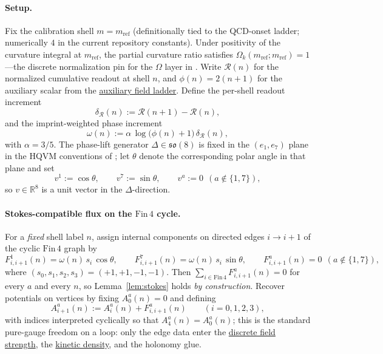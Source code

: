 \documentclass[11pt]{amsart}
\begin{document}
\paragraph{Setup.}
Fix the calibration shell \(m=m_{\mathrm{ref}}\) (definitionally tied to the QCD-onset ladder; numerically \(4\) in the current repository constants). Under positivity of the curvature integral at \(m_{\mathrm{ref}}\), the partial curvature ratio satisfies \(\Omega_k(m_{\mathrm{ref}};m_{\mathrm{ref}})=1\)---the discrete normalization pin for the \(\Omega\) layer in \cite{hqiv-so8-paper}. Write \(\mathcal{R}(n)\) for the normalized cumulative readout at shell \(n\), and \(\phi(n)=2(n+1)\) for the auxiliary scalar from the \hyperref[lean:phi-ladder]{auxiliary field ladder}. Define the per-shell readout increment
\[
\delta_{\mathcal{R}}(n):=\mathcal{R}(n+1)-\mathcal{R}(n),
\]
and the imprint-weighted phase increment
\begin{equation}
\label{eq:omega-n}
\omega(n):=\alpha\,\log\bigl(\phi(n)+1\bigr)\,\delta_{\mathcal{R}}(n),
\end{equation}
with \(\alpha=3/5\). The phase-lift generator \(\Delta\in\mathfrak{so}(8)\) is fixed in the \((e_1,e_7)\) plane in the HQVM conventions of \cite{hqiv-so8-paper}; let \(\theta\) denote the corresponding polar angle in that plane and set
\[
v^1:=\cos\theta,\qquad v^7:=\sin\theta,\qquad v^a:=0\ \ (a\notin\{1,7\}),
\]
so \(v\in\mathbb{R}^8\) is a unit vector in the \(\Delta\)-direction.

\paragraph{Stokes-compatible flux on the \(\mathrm{Fin}\,4\) cycle.}
For a \emph{fixed} shell label \(n\), assign internal components on directed edges \(i\to i+1\) of the cyclic \(\mathrm{Fin}\,4\) graph by
\begin{equation}
\label{eq:seed-F}
F^1_{i,i+1}(n)=\omega(n)\,s_i\,\cos\theta,\qquad
F^7_{i,i+1}(n)=\omega(n)\,s_i\,\sin\theta,\qquad
F^a_{i,i+1}(n)=0\ \ (a\notin\{1,7\}),
\end{equation}
where \((s_0,s_1,s_2,s_3)=(+1,+1,-1,-1)\). Then \(\sum_{i\in \mathrm{Fin}\,4} F^a_{i,i+1}(n)=0\) for every \(a\) and every \(n\), so Lemma~\ref{lem:stokes} holds \emph{by construction}. Recover potentials on vertices by fixing \(A^a_0(n)=0\) and defining
\[
A^a_{i+1}(n):=A^a_i(n)+F^a_{i,i+1}(n)\qquad (i=0,1,2,3),
\]
with indices interpreted cyclically so that \(A^a_4(n)=A^a_0(n)\); this is the standard pure-gauge freedom on a loop: only the edge data enter the \hyperref[lean:F-from-A]{discrete field strength}, the \hyperref[lean:LO-kinetic]{kinetic density}, and the holonomy glue.
\end{document}
